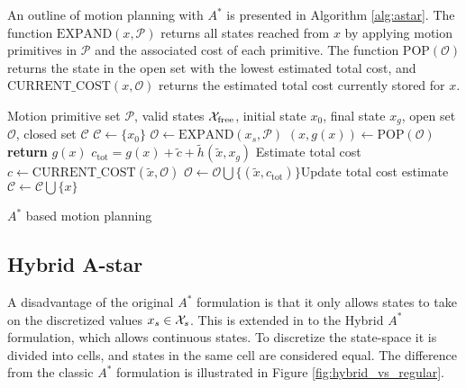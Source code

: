 An outline of motion planning with $A^*$ is presented in Algorithm \ref{alg:astar}.
The function $\text{EXPAND}(x, \mathcal{P})$ returns all states reached from $x$ by applying motion primitives in $\mathcal{P}$ and the associated cost of each primitive. The function $\text{POP}(\mathcal{O})$ returns the state in
the open set with the lowest estimated total cost, 
and \\$\text{CURRENT\_COST}(x,\mathcal{O})$  returns the estimated total cost currently stored for $x$. 


\begin{algorithm}
    \begin{algorithmic}
        \Require Motion primitive set $\mathcal{P}$, valid states $\mathcal{X}_{\text{free}}$, initial state $x_0$, final state $x_g$, open set $\mathcal{O}$, closed set $\mathcal{C}$
            \State $\mathcal{C}\gets \{x_0\}$
            \State $\mathcal{O}\gets\text{EXPAND}(x_s, \mathcal{P})$
                \State $(x,g(x))\gets \text{POP}(\mathcal{O})$
                 
                    \State \textbf{return} $g(x)$
                \EndIf
                        \State $c_{\text{tot}}=g(x) + \tilde{c} + \tilde{h}(\tilde{x}, x_{g})$ \Comment Estimate total cost
                        \State $c\gets\text{CURRENT\_COST}(\tilde{x}, \mathcal{O})$
                            \State $\mathcal{O}\gets\mathcal{O}\bigcup\{(\tilde{x},c_{\text{tot}})\}$\Comment Update total cost estimate
                        \EndIf
                    \EndIf
                \EndFor
            \State $\mathcal{C}\gets\mathcal{C}\bigcup \{x\}$
            \EndWhile
        \end{algorithmic}
        \caption{$A^*$ based motion planning}
        \label{alg:astar}
\end{algorithm}

\subsection{Hybrid A-star}\label{sec:hybrid-a-star}
A disadvantage of the original $A^*$ formulation is that it only allows states to take on the discretized values $x_s\in\mathcal{X}_s$. This is extended in \cite{hybrid_astar} to the Hybrid $A^*$ formulation,
which allows continuous states. To discretize the state-space it is divided into cells, and states in the same cell are considered equal. The difference from the classic $A^*$ formulation is illustrated in 
Figure \ref{fig:hybrid_vs_regular}.

